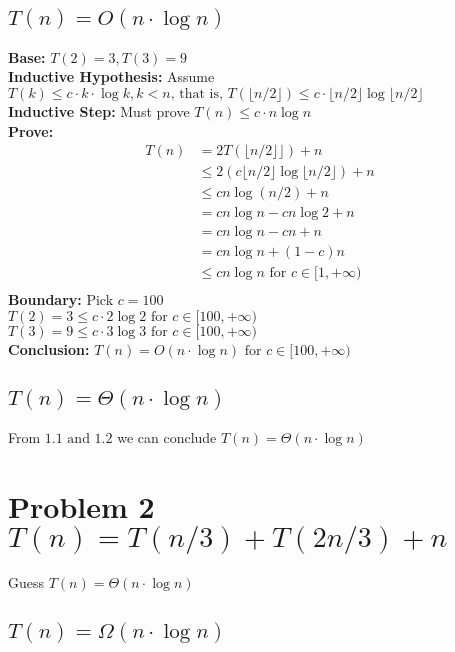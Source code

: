 \documentclass[a4paper]{article}
\begin{document}
\subsection{$T(n)= O(n\cdot \log n)$}

\textbf{Base:} $T(2)=3, T(3)=9$\\
\textbf{Inductive Hypothesis:} Assume $T(k)\leq c\cdot k \cdot \log{k}, k< n\text{, that is, }T(\lfloor{n/2}\rfloor)\leq c\cdot \lfloor{n/2}\rfloor\log{\lfloor{n/2}\rfloor}$\\
\textbf{Inductive Step:} Must prove $T(n)\leq c\cdot n\log{n}$\\
\textbf{Prove:}\\
\begin{align*}
    T(n) & = 2T(\lfloor{n/2}\rfloor⌋) + n \\
    & \leq 2(c\lfloor{n/2}\rfloor\log{\lfloor{n/2}\rfloor})+n \\ 
    & \leq cn\log{(n/2)}+n \\
    & = cn \log{n} -cn\log{2}+n\\
    & = cn \log n - cn+n \\
    & = cn \log n +(1-c)n \\
    & \leq cn \log n \text{ for } c\in[1,+\infty)\\
\end{align*}
\textbf{Boundary:} Pick $c=100$\\
$T(2)=3\leq c\cdot 2\log 2 \text{ for } c\in[100,+\infty)$\\ 
$T(3)=9 \leq c\cdot 3\log3 \text{ for } c\in[100,+\infty)$\\
\textbf{Conclusion: }$T(n)= O(n\cdot \log n)\text{ for } c\in[100,+\infty) $

\subsection{$T(n)= \Theta(n\cdot \log n)$}
From $1.1 \text{ and } 1.2$ we can conclude {$T(n)= \Theta(n\cdot \log n)$}

\section{Problem 2 $T(n) = T(n/3) + T(2n/3) + n$} 
Guess $T(n)=\Theta(n\cdot \log n)$

\subsection{$T(n)= \Omega(n\cdot \log n)$}
\end{document}
